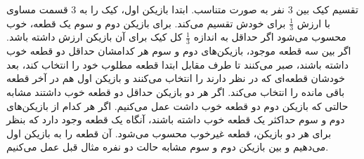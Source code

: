 \documentclass{article}
\begin{document}
\begin{example}
    تقسیم کیک بین 
    $
    3
    $
    نفر به صورت متناسب.
    ابتدا بازیکن اول، کیک را به
    $
    3
    $
    قسمت مساوی با ارزش $\frac{1}{3}$ برای خودش تقسیم می‌کند.
    برای بازیکن دوم و سوم یک قطعه، خوب محسوب می‌شود اگر حداقل به اندازه 
    $
    \frac{1}{3}
    $
    کل کیک برای آن بازیکن ارزش داشته باشد.
    اگر بین سه قطعه موجود، بازیکن‌های دوم و سوم
    هر کدامشان
    حداقل دو قطعه خوب داشته باشند، صبر می‌کنند
    تا طرف مقابل ابتدا قطعه مطلوب خود را انتخاب کند، بعد خودشان قطعه‌ای که در نظر دارند را انتخاب می‌کنند و بازیکن اول هم در آخر قطعه باقی مانده را انتخاب می‌کند.
    اگر هر دو بازیکن حداقل دو قطعه خوب داشتند مشابه حالتی که بازیکن دوم دو قطعه خوب داشت عمل می‌کنیم.
    اگر هر کدام از بازیکن‌های دوم و سوم 
    حداکثر یک قطعه خوب داشته باشند، آنگاه یک قطعه وجود دارد که بنظر برای هر دو بازیکن، قطعه غیرخوب محسوب می‌شود.
    آن قطعه را به بازیکن اول ‌می‌دهیم و بین بازیکن دوم و سوم مشابه حالت دو نفره مثال قبل عمل می‌کنیم.
\end{example}

\end{document}

